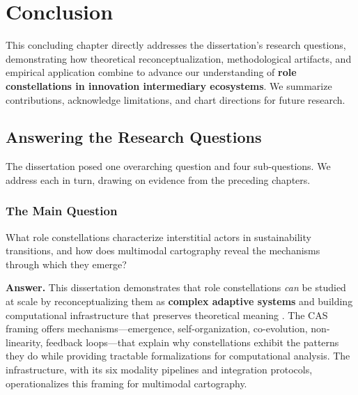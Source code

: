 \documentclass[../main.tex]{subfiles}
\begin{document}
\chapter{Conclusion}
\margintoc

\begin{chapteroverview}
This concluding chapter directly addresses the dissertation's research questions, demonstrating how theoretical reconceptualization, methodological artifacts, and empirical application combine to advance our understanding of \textbf{role constellations in innovation intermediary ecosystems}. We summarize contributions, acknowledge limitations, and chart directions for future research.
\end{chapteroverview}

\section{Answering the Research Questions}

The dissertation posed one overarching question and four sub-questions. We address each in turn, drawing on evidence from the preceding chapters.

\subsection{The Main Question}

\begin{mainrq}
What role constellations characterize interstitial actors in sustainability transitions, and how does multimodal cartography reveal the mechanisms through which they emerge?
\end{mainrq}

\noindent\textbf{Answer.} This dissertation demonstrates that role constellations \emph{can} be studied at scale by reconceptualizing them as \textbf{complex adaptive systems} and building computational infrastructure that preserves theoretical meaning . The CAS framing offers mechanisms---emergence, self-organization, co-evolution, non-linearity, feedback loops---that explain why constellations exhibit the patterns they do while providing tractable formalizations for computational analysis. The \RoleBox{} infrastructure, with its six modality pipelines and integration protocols, operationalizes this framing for multimodal cartography.
\end{document}

